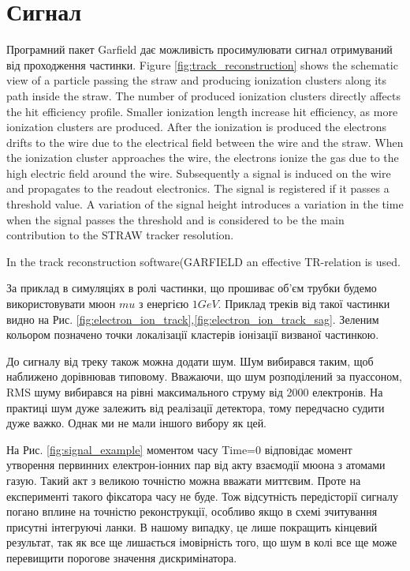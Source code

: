 \documentclass[]{article}
\begin{document}
	\section{Сигнал}	
	Програмний пакет Garfield дає можливість просимулювати сигнал отримуваний від проходження частинки. 
	Figure \ref{fig:track_reconstruction} shows the schematic view of a particle passing the straw and producing ionization clusters along its path inside the straw. The number of produced ionization clusters directly affects the hit efficiency profile.  Smaller ionization length increase hit efficiency, as more ionization clusters are produced.  After the ionization is produced the electrons drifts to the wire due to the electrical field between the wire and the straw. When the ionization cluster approaches the wire, the electrons ionize the gas due to the high electric field around the wire.  Subsequently a signal is induced on the wire and propagates to the readout electronics. The signal is registered if it passes a threshold value. A variation of the signal height introduces a variation in the time when the
signal passes the threshold and is considered to be the main contribution to the STRAW tracker resolution. 

	In the track reconstruction software(GARFIELD \cite{garfield} an effective TR-relation is used.
	
	За приклад в симуляціях в ролі частинки, що прошиває об’єм трубки будемо використовувати мюон $mu$ з енергією $1GeV$. Приклад треків від такої частинки видно на Рис. \ref{fig:electron_ion_track},\ref{fig:electron_ion_track_sag}. Зеленим кольором позначено точки локалізації кластерів іонізації визваної частинкою.
	
	До сигналу від треку також можна додати шум. Шум вибирався таким, щоб наближено дорівнював типовому. Вважаючи, що шум розподілений за пуассоном, RMS шуму вибирався на рівні максимального струму від 2000 електронів. На практиці шум дуже залежить від реалізації детектора, тому передчасно судити дуже важко. Однак ми не мали іншого вибору як цей.
	 
	На Рис. \ref{fig:signal_example} моментом часу Time=0 відповідає момент утворення первинних електрон-іонних пар від акту взаємодії мюона з атомами газую. Такий акт з великою точністю можна вважати миттєвим. Проте на експерименті такого фіксатора часу не буде. Тож відсутність передісторії сигналу погано вплине на точністю реконструкції, особливо якщо в схемі зчитування присутні інтегруючі ланки. В нашому випадку, це лише покращить кінцевий результат, так як все ще лишається імовірність того, що шум в колі все ще може перевищити порогове значення дискримінатора.
	
\end{document}
